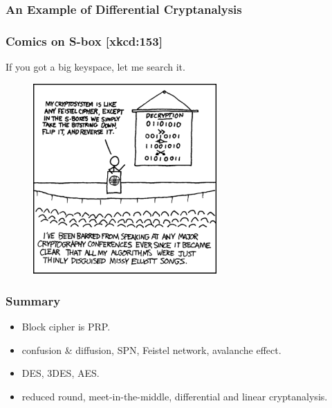 \begin{frame}\frametitle{An Example of Differential Cryptanalysis}
\begin{figure}
\begin{center}

\end{center}
\end{figure}
\end{frame}
\begin{frame}\frametitle{Comics on S-box [xkcd:153]}
If you got a big keyspace, let me search it.
\begin{figure}
\begin{center}
\includegraphics[width=70mm]{pic/sbox-talk} 
\end{center}
\end{figure}
\end{frame}
\begin{frame}\frametitle{Summary}
\begin{itemize}
\item Block cipher is PRP.
\item confusion \& diffusion, SPN, Feistel network, avalanche effect.
\item DES, 3DES, AES.
\item reduced round, meet-in-the-middle, differential and linear cryptanalysis. 
\end{itemize}
\end{frame}
